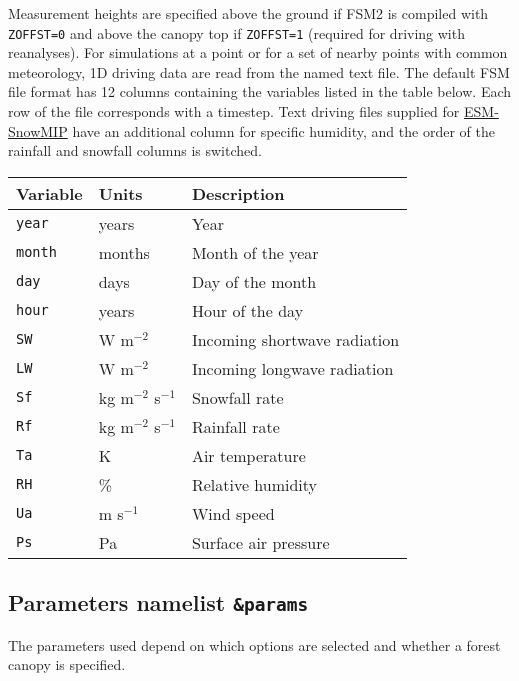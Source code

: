 \documentclass{article}
\begin{document}
Measurement heights are specified above the ground if FSM2 is compiled with {\tt ZOFFST=0} and above the canopy top if {\tt ZOFFST=1} (required for driving with reanalyses). For simulations at a point or for a set of nearby points with common meteorology, 1D driving data are read from the named text file. The default FSM file format has 12 columns containing the variables listed in the table below. Each row of the file corresponds with a timestep. Text driving files supplied for \href{https://www.geos.ed.ac.uk/~ressery/ESM-SnowMIP/ESMSnowMIP_Reference_sites.pdf}{ESM-SnowMIP} have an additional column for specific humidity, and the order of the rainfall and snowfall columns is switched.

\begin{tabular}{|l|l|l|}
\hline
Variable & Units                & Description                  \\
\hline
{\tt year}  & years             & Year                         \\
{\tt month} & months            & Month of the year            \\
{\tt day}   & days              & Day of the month             \\
{\tt hour}  & years             & Hour of the day              \\
{\tt SW} & W m$^{-2}$           & Incoming shortwave radiation \\
{\tt LW} & W m$^{-2}$           & Incoming longwave radiation  \\
{\tt Sf} & kg m$^{-2}$ s$^{-1}$ & Snowfall rate                \\
{\tt Rf} & kg m$^{-2}$ s$^{-1}$ & Rainfall rate                \\
{\tt Ta} & K                    & Air temperature              \\
{\tt RH} & \%                   & Relative humidity            \\
{\tt Ua} & m s$^{-1}$           & Wind speed                   \\
{\tt Ps} & Pa                   & Surface air pressure         \\
\hline 
\end{tabular}

\subsection*{Parameters namelist {\tt \&params}}

The parameters used depend on which options are selected and whether a forest canopy is specified.
\end{document}
